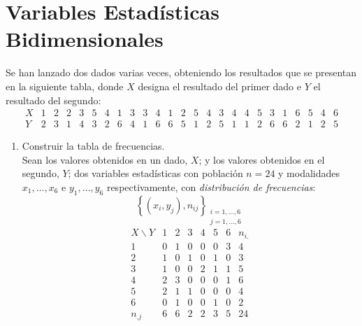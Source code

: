 \section{Variables Estadísticas Bidimensionales}

\begin{ejercicio} \label{ej:2.Ejercicio1}
    Se han lanzado dos dados varias veces, obteniendo los resultados que se presentan en la siguiente tabla, donde $X$ designa el resultado del primer dado e $Y$ el resultado del segundo:
    \begin{equation*}
        \begin{array}{|c|c|c|c|c|c|c|c|c|c|c|c|c|c|c|c|c|c|c|c|c|c|c|c|c|}
            X & 1 &  2 & 2 & 3 & 5 & 4 & 1 & 3 & 3 & 4 & 1 & 2 & 5 & 4 & 3 & 4 & 4 & 5 & 3 & 1 & 6 & 5 & 4 & 6\\ \hline
            Y & 2 & 3 & 1 & 4 & 3 & 2 & 6 & 4 & 1 & 6 & 6 & 5 & 1 & 2 & 5 & 1 & 1 & 2 & 6 & 6 & 2 & 1 & 2 & 5
        \end{array}
    \end{equation*}

    \begin{enumerate}
        \item Construir la tabla de frecuencias.\\
        Sean los valores obtenidos en un dado, $X$; y los valores obtenidos en el segundo, $Y$; dos variables estadísticas con población $n=24$ y modalidades $x_1, \dots, x_6$ e $y_1, \dots, y_6$ respectivamente, con \emph{distribución de frecuencias}:
        $$\left\{ (x_i,y_j), n_{ij}\right\}_{\substack{i=1,\dots,6\\j=1,\dots,6}}$$
        \begin{equation*}
            \begin{array}{c|cccccc|c}
                X\backslash Y & 1 & 2 & 3 & 4 & 5 & 6 &n_{i.}\\ \hline
                1 & 0 & 1 & 0 & 0 & 0 & 3 & 4\\
                2 & 1 & 0 & 1 & 0 & 1 & 0 & 3\\
                3 & 1 & 0 & 0 & 2 & 1 & 1 & 5\\
                4 & 2 & 3 & 0 & 0 & 0 & 1 & 6\\
                5 & 2 & 1 & 1 & 0 & 0 & 0 & 4\\
                6 & 0 & 1 & 0 & 0 & 1 & 0 & 2\\ \hline
                n_{.j} & 6 & 6 & 2 & 2 & 3 & 5 & 24
            \end{array}
        \end{equation*}
        

\end{enumerate}
\end{ejercicio}
